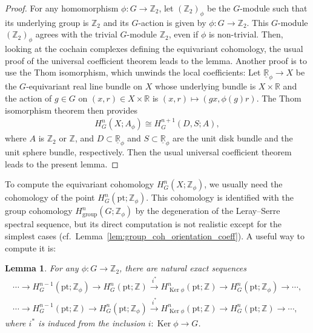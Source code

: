 \documentclass[pdftex]{sigma}
\newtheorem{lem}[thm]{Lemma}
\theoremstyle{definition}
\newcommand{\R}{\mathbb{R}}
\newcommand{\Z}{\mathbb{Z}}
\newcommand{\pt}{\mathrm{pt}}
\begin{document}
\begin{proof}
For any homomorphism $\phi \colon G \to \Z_2$, let $(\Z_2)_\phi$ be the $G$-module such that its underlying group is $\Z_2$ and its $G$-action is given by $\phi \colon G \to \Z_2$. This $G$-module $(\Z_2)_\phi$ agrees with the trivial $G$-module $\Z_2$, even if $\phi$ is non-trivial. Then, looking at the cochain complexes def\/ining the equivariant cohomology, the usual proof of the universal coef\/f\/icient theorem leads to the lemma. Another proof is to use the Thom isomorphism, which unwinds the local coef\/f\/icients: Let $\underline{\R}_{\phi} \to X$ be the $G$-equivariant real line bundle on $X$ whose underlying bundle is $X \times \R$ and the action of $g \in G$ on $(x, r) \in X \times \R$ is $(x, r) \mapsto (gx, \phi(g)r)$. The Thom isomorphism theorem then provides
\begin{gather*}
H^n_G(X; A_\phi) \cong H^{n+1}_G(D, S; A),
\end{gather*}
where $A$ is $\Z_2$ or $\Z$, and $D \subset \underline{\R}_\phi$ and $S \subset \underline{\R}_\phi$ are the unit disk bundle and the unit sphere bundle, respectively. Then the usual universal coef\/f\/icient theorem leads to the present lemma.
\end{proof}

To compute the equivariant cohomology $H^n_G(X; \Z_\phi)$, we usually need the cohomology of the point $H^n_G(\pt; \Z_\phi)$. This cohomology is identif\/ied with the group cohomology $H^n_{\mathrm{group}}(G; \Z_\phi)$ by the degeneration of the Leray--Serre spectral sequence, but its direct computation is not realistic except for the simplest cases (cf.\ Lemma~\ref{lem:group_coh_orientation_coeff}). A useful way to compute it is:

\begin{lem} \label{lem:exact_seq}
For any $\phi \colon G \to \Z_2$, there are natural exact sequences
\begin{gather*}
\cdots \to H^{n-1}_G(\pt; \Z_\phi) \to H^n_G(\pt; \Z) \overset{i^*}{\to} H^n_{\operatorname{Ker}\phi}(\pt; \Z) \to H^n_G(\pt; \Z_\phi) \to \cdots, \\
\cdots \to H^{n-1}_G(\pt; \Z) \to H^n_G(\pt; \Z_\phi) \overset{i^*}{\to} H^n_{\operatorname{Ker}\phi}(\pt; \Z) \to H^n_G(\pt; \Z) \to \cdots,
\end{gather*}
where $i^*$ is induced from the inclusion $i \colon \operatorname{Ker}\phi \to G$.
\end{lem}
\end{document}
